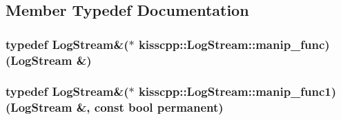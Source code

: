 \subsection{Member Typedef Documentation}
\hypertarget{classkisscpp_1_1_log_stream_abb058ef2b1b57fb7e0b89c3312794ada}{
\subsubsection[{manip\-\_\-func}]{\setlength{\rightskip}{0pt plus 5cm}typedef {\bf Log\-Stream}\&($\ast$ kisscpp\-::\-Log\-Stream\-::manip\-\_\-func)({\bf Log\-Stream} \&)}}\label{classkisscpp_1_1_log_stream_abb058ef2b1b57fb7e0b89c3312794ada}
\hypertarget{classkisscpp_1_1_log_stream_ab6994c757d4c63c4388a932cf2be2c9d}{
\subsubsection[{manip\-\_\-func1}]{\setlength{\rightskip}{0pt plus 5cm}typedef {\bf Log\-Stream}\&($\ast$ kisscpp\-::\-Log\-Stream\-::manip\-\_\-func1)({\bf Log\-Stream} \&, const bool permanent)}}\label{classkisscpp_1_1_log_stream_ab6994c757d4c63c4388a932cf2be2c9d}


